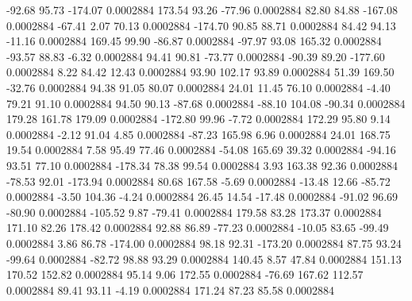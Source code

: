       -92.68       95.73     -174.07     0.0002884
      173.54       93.26      -77.96     0.0002884
       82.80       84.88     -167.08     0.0002884
      -67.41        2.07       70.13     0.0002884
     -174.70       90.85       88.71     0.0002884
       84.42       94.13      -11.16     0.0002884
      169.45       99.90      -86.87     0.0002884
      -97.97       93.08      165.32     0.0002884
      -93.57       88.83       -6.32     0.0002884
       94.41       90.81      -73.77     0.0002884
      -90.39       89.20     -177.60     0.0002884
        8.22       84.42       12.43     0.0002884
       93.90      102.17       93.89     0.0002884
       51.39      169.50      -32.76     0.0002884
       94.38       91.05       80.07     0.0002884
       24.01       11.45       76.10     0.0002884
       -4.40       79.21       91.10     0.0002884
       94.50       90.13      -87.68     0.0002884
      -88.10      104.08      -90.34     0.0002884
      179.28      161.78      179.09     0.0002884
     -172.80       99.96       -7.72     0.0002884
      172.29       95.80        9.14     0.0002884
       -2.12       91.04        4.85     0.0002884
      -87.23      165.98        6.96     0.0002884
       24.01      168.75       19.54     0.0002884
        7.58       95.49       77.46     0.0002884
      -54.08      165.69       39.32     0.0002884
      -94.16       93.51       77.10     0.0002884
     -178.34       78.38       99.54     0.0002884
        3.93      163.38       92.36     0.0002884
      -78.53       92.01     -173.94     0.0002884
       80.68      167.58       -5.69     0.0002884
      -13.48       12.66      -85.72     0.0002884
       -3.50      104.36       -4.24     0.0002884
       26.45       14.54      -17.48     0.0002884
      -91.02       96.69      -80.90     0.0002884
     -105.52        9.87      -79.41     0.0002884
      179.58       83.28      173.37     0.0002884
      171.10       82.26      178.42     0.0002884
       92.88       86.89      -77.23     0.0002884
      -10.05       83.65      -99.49     0.0002884
        3.86       86.78     -174.00     0.0002884
       98.18       92.31     -173.20     0.0002884
       87.75       93.24      -99.64     0.0002884
      -82.72       98.88       93.29     0.0002884
      140.45        8.57       47.84     0.0002884
      151.13      170.52      152.82     0.0002884
       95.14        9.06      172.55     0.0002884
      -76.69      167.62      112.57     0.0002884
       89.41       93.11       -4.19     0.0002884
      171.24       87.23       85.58     0.0002884
